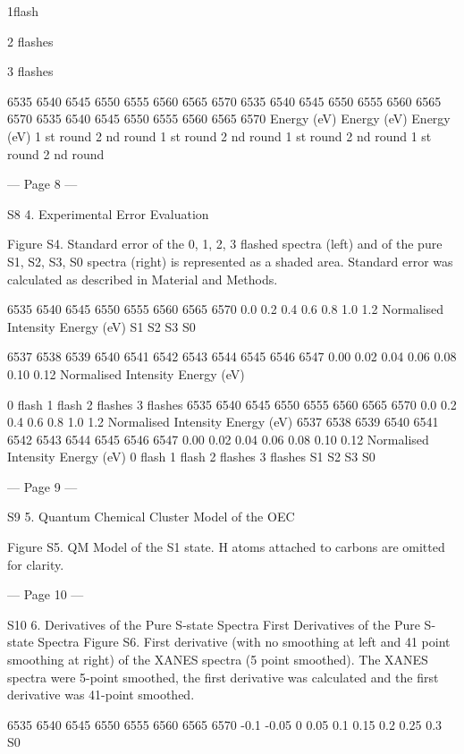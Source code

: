 1ﬂash
 
 
 
2 ﬂashes
 
 
 
3 ﬂashes
 
 
6535 6540
6545
6550
6555
6560
6565
6570
6535 6540
6545
6550
6555
6560
6565
6570
6535 6540
6545
6550
6555
6560
6565
6570
 Energy (eV)
 Energy (eV)
 Energy (eV)
1
st
 round
2
nd
 round
1
st
 round
2
nd
 round
1
st
 round
2
nd
 round
1
st
 round
2
nd round


--- Page 8 ---
 
S8 
4. Experimental Error Evaluation 
 
Figure S4. Standard error of the 0, 1, 2, 3 flashed spectra (left) and of the pure S1, S2, S3, S0 spectra (right) is 
represented as a shaded area. Standard error was calculated as described in Material and Methods.  
 
 
 
 
 
 
6535
6540
6545
6550
6555
6560
6565
6570
0.0
0.2
0.4
0.6
0.8
1.0
1.2
Normalised Intensity
Energy (eV)
S1
S2
S3
S0
 
 
6537 6538 6539 6540 6541 6542 6543 6544 6545 6546 6547
0.00
0.02
0.04
0.06
0.08
0.10
0.12
Normalised Intensity
Energy (eV)
 
 
0 ﬂash
1 ﬂash
2 ﬂashes
3 ﬂashes
6535
6540
6545
6550
6555
6560
6565
6570
0.0
0.2
0.4
0.6
0.8
1.0
1.2
Normalised Intensity
Energy (eV)
6537 6538 6539 6540 6541 6542 6543 6544 6545 6546 6547
0.00
0.02
0.04
0.06
0.08
0.10
0.12
Normalised Intensity
Energy (eV)
0 ﬂash
1 ﬂash
2 ﬂashes
3 ﬂashes
S1
S2
S3
S0


--- Page 9 ---
 
S9 
5. Quantum Chemical Cluster Model of the OEC 
 
 
Figure S5. QM Model of the S1 state. H atoms attached to carbons are omitted for clarity. 
 
 


--- Page 10 ---
 
S10 
6. Derivatives of the Pure S-state Spectra 
First Derivatives of the Pure S-state Spectra 
Figure S6. First derivative (with no smoothing at left and 41 point smoothing at right) of the XANES spectra (5 
point smoothed). The XANES spectra were 5-point smoothed, the first derivative was calculated and the first 
derivative was 41-point smoothed. 
 
 
6535 6540 6545 6550 6555 6560 6565 6570
-0.1
-0.05
0
0.05
0.1
0.15
0.2
0.25
0.3
S0
 
 
   
